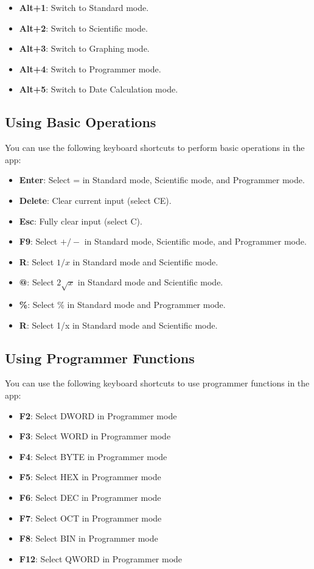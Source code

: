 \documentclass[12pt]{article}
\begin{document}
\begin{itemize}
    \item \textbf{Alt+1}: Switch to Standard mode.
    \item \textbf{Alt+2}: Switch to Scientific mode.
    \item \textbf{Alt+3}: Switch to Graphing mode.
    \item \textbf{Alt+4}: Switch to Programmer mode.
    \item \textbf{Alt+5}: Switch to Date Calculation mode.
\end{itemize}

\subsection{Using Basic Operations}
You can use the following keyboard shortcuts to perform basic operations in the app\cite{calculator-shortcuts}:

\begin{itemize}
    \item \textbf{Enter}: Select = in Standard mode, Scientific mode, and Programmer mode.
    \item \textbf{Delete}: Clear current input (select CE).
    \item \textbf{Esc}: Fully clear input (select C).
    \item \textbf{F9}: Select $+/-$ in Standard mode, Scientific mode, and Programmer mode.
    \item \textbf{R}: Select $1/x$ in Standard mode and Scientific mode.
    \item \textbf{@}: Select $2\sqrt{x}$ in Standard mode and Scientific mode.
    \item \textbf{\%}: Select $\%$ in Standard mode and Programmer mode.
    \item \textbf{R}: Select 1/x in Standard mode and Scientific mode.
\end{itemize}

\pagebreak

\subsection{Using Programmer Functions}
You can use the following keyboard shortcuts to use programmer functions in the app\cite{calculator-shortcuts}:

\begin{itemize}
    \item \textbf{F2}: Select DWORD in Programmer mode
    \item \textbf{F3}: Select WORD in Programmer mode
    \item \textbf{F4}: Select BYTE in Programmer mode
    \item \textbf{F5}: Select HEX in Programmer mode
    \item \textbf{F6}: Select DEC in Programmer mode
    \item \textbf{F7}: Select OCT in Programmer mode
    \item \textbf{F8}: Select BIN in Programmer mode
    \item \textbf{F12}: Select QWORD in Programmer mode
\end{itemize}
\end{document}
